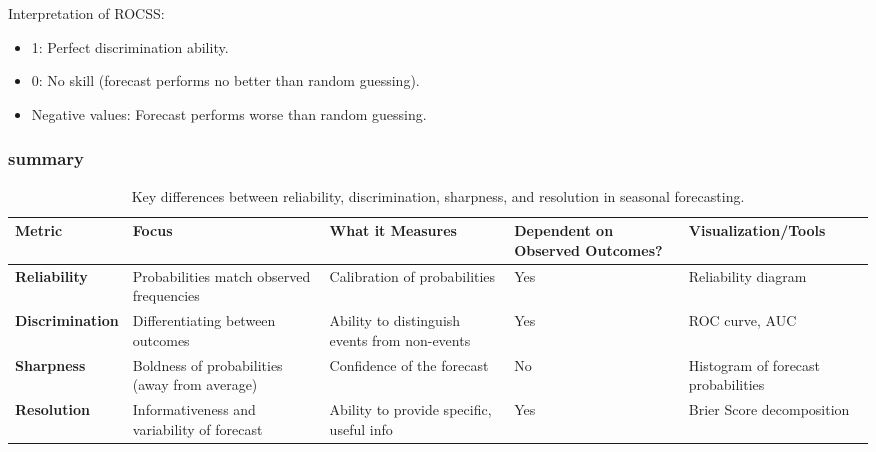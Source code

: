 Interpretation of ROCSS:
\begin{itemize}
	\item 1: Perfect discrimination ability.
	\item 0: No skill (forecast performs no better than random guessing).
	\item Negative values: Forecast performs worse than random guessing.
\end{itemize}
	



\subsubsection{summary}
\begin{table}[h!]
\centering
\begin{tabularx}{\textwidth}{@{}p{2.5cm}p{4cm}p{4cm}p{2.5cm}p{3cm}@{}}
\toprule
\textbf{Metric}       & \textbf{Focus}                                    & \textbf{What it Measures}                         & \textbf{Dependent on Observed Outcomes?} & \textbf{Visualization/Tools}             \\ \midrule
\textbf{Reliability}   & Probabilities match observed frequencies          & Calibration of probabilities                      & Yes                                      & Reliability diagram                      \\
\textbf{Discrimination} & Differentiating between outcomes                 & Ability to distinguish events from non-events    & Yes                                      & ROC curve, AUC                           \\
\textbf{Sharpness}     & Boldness of probabilities (away from average)     & Confidence of the forecast                        & No                                       & Histogram of forecast probabilities      \\
\textbf{Resolution}    & Informativeness and variability of forecast       & Ability to provide specific, useful info         & Yes                                      & Brier Score decomposition                \\ \bottomrule
\end{tabularx}
\caption{Key differences between reliability, discrimination, sharpness, and resolution in seasonal forecasting.}
\label{tab:forecast_metrics}
\end{table}

\newpage
\thispagestyle{empty}
\mbox{}